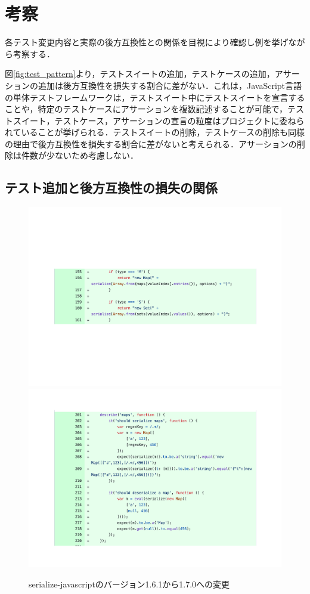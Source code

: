 \documentclass[11pt,dvipdfmx]{jreport}
\begin{document}
\section{考察}
各テスト変更内容と実際の後方互換性との関係を目視により確認し例を挙げながら考察する．

図\ref{fig:test_pattern}より，テストスイートの追加，テストケースの追加，アサーションの追加は後方互換性を損失する割合に差がない．これは，JavaScript言語の単体テストフレームワークは，テストスイート中にテストスイートを宣言することや，特定のテストケースにアサーションを複数記述することが可能で，テストスイート，テストケース，アサーションの宣言の粒度はプロジェクトに委ねられていることが挙げられる．テストスイートの削除，テストケースの削除も同様の理由で後方互換性を損失する割合に差がないと考えられる．アサーションの削除は件数が少ないため考慮しない．

\subsection{テスト追加と後方互換性の損失の関係}

\begin{figure}[t]
  \label{fig:rq1.insert-test}
  \centering
  \includegraphics[width=1.0\linewidth]{fig/rq1/set-map/map.pdf}
  \includegraphics[width=1.0\linewidth]{fig/rq1/set-map/map.test.pdf}
  \caption{serialize-javascriptのバージョン1.6.1から1.7.0への変更}
\end{figure}
\end{document}
